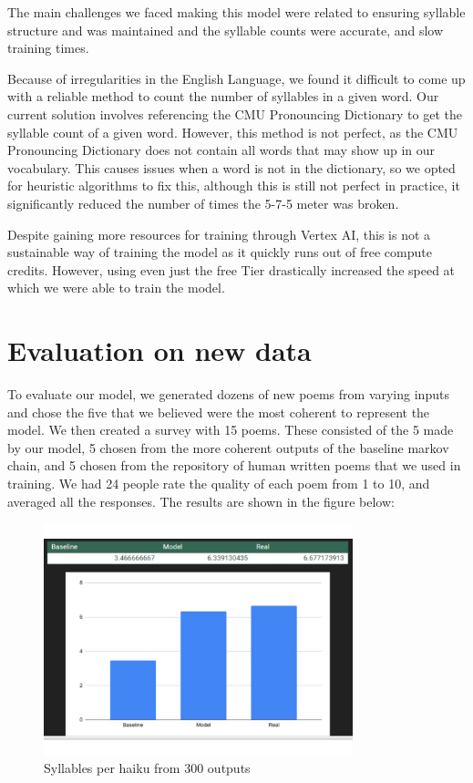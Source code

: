 \documentclass{article} %
\begin{document}
The main challenges we faced making this model were
related to ensuring syllable structure and was maintained and the syllable counts were accurate, and
slow training times.

Because of irregularities in the English Language, we found it difficult to
come up with a reliable method to count the number of syllables in a given word. Our current solution involves referencing
the CMU Pronouncing Dictionary \citep{cmu_pronouncing_dictionary} to get the syllable count of a given word.
However, this method is not perfect, as the CMU Pronouncing Dictionary does not contain all words that may show up in our vocabulary.
This causes issues when a word is not in the dictionary, so we opted for heuristic algorithms to fix this,
although this is still not perfect in practice, it significantly reduced the number of times the 5-7-5 meter was broken.

Despite gaining more resources for training through Vertex AI,
this is not a sustainable way of training the model as it quickly runs out of free compute credits.
However, using even just the free Tier drastically increased the speed at which we were able to train the model.

\section{Evaluation on new data}
To evaluate our model, we generated dozens of new poems from varying inputs and chose the five that we believed were the most coherent to represent the model. We then created a survey with 15 poems. These consisted of the 5 made by our model, 5 chosen from the more coherent outputs of the baseline markov chain, and 5 chosen from the repository of human written poems that we used in training. We had 24 people rate the quality of each poem from 1 to 10, and averaged all the responses. The results are shown in the figure below:

\begin{figure}[h]
  \begin{center}
  \includegraphics[width=0.8\textwidth]{Figs/survey_results.png}
  \end{center}
  \caption{Syllables per haiku from 300 outputs}
  \label{fig:plot2}
\end{figure}
\FloatBarrier
\end{document}
